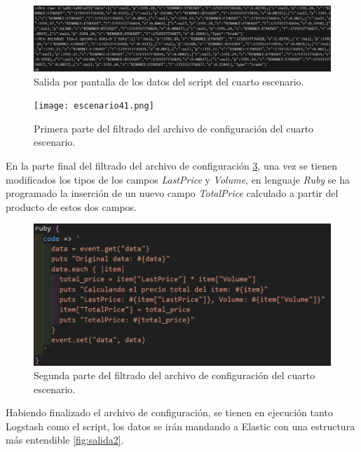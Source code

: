 \begin{figure}
    \centering
    \includegraphics[width=1\linewidth]{img/salida1.png}
    \caption{Salida por pantalla de los datos del script del cuarto escenario.}
    \label{fig:salida1}
\end{figure}


\begin{figure}
    \centering
    \texttt{[image: escenario41.png]}
    \caption{Primera parte del filtrado del archivo de configuración del cuarto escenario.}
    \label{fig:filtrado1}
\end{figure}


En la parte final del filtrado del archivo de configuración \ref{fig:filtrado2}, una vez se tienen modificados los tipos de los campos \textit{LastPrice} y \textit{Volume}, en lenguaje \textit{Ruby} se ha programado la inserción de un nuevo campo \textit{TotalPrice} calculado a partir del producto de estos dos campos.
\begin{figure}
    \centering
    \includegraphics[width=1\linewidth]{img/escenario42.png}
    \caption{Segunda parte del filtrado del archivo de configuración del cuarto escenario.}
    \label{fig:filtrado2}
\end{figure}

Habiendo finalizado el archivo de configuración, se tienen en ejecución tanto Logstash como el script, los datos se irán mandando a Elastic con una estructura más entendible \ref{fig:salida2}.

